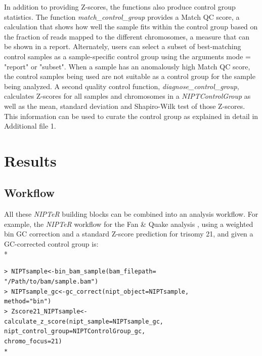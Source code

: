 In addition to providing Z-scores, the functions also produce control group statistics. 
The function \textsl{match\_control\_group} provides a Match QC score, a calculation that shows how well the sample fits within the control group based on the fraction of reads mapped to the different chromosomes, a measure that can be shown in a report. 
Alternately, users can select a subset of best-matching control samples as a sample-specific control group using the arguments mode = "report" or "subset". 
When a sample has an anomalously high Match QC score, the control samples being used are not suitable as a control group for the sample being analyzed. 
A second quality control function, \textsl{diagnose\_control\_group}, calculates Z-scores for all samples and chromosomes in a \textsl{NIPTControlGroup} as well as the mean, standard deviation and Shapiro-Wilk test of those Z-scores. 
This information can be used to curate the control group as explained in detail in Additional file 1.

\section{Results}\label{Results}
\subsection{Workflow}
All these \textsl{NIPTeR} building blocks can be combined into an analysis workflow. For example, the \textsl{NIPTeR} workflow for the Fan \& Quake analysis \cite{Fan_2010}, using a weighted bin GC correction and a standard Z-score prediction for trisomy 21, and given a GC-corrected control group is: \\* \vspace{-\baselineskip} %


\begin{alltt}
	\footnotesize  
		\noindent\textgreater\ NIPTsample \textless- bin\_bam\_sample(bam\_filepath = \\\indent "/Path/to/bam/sample.bam") \\
		\textgreater\ NIPTsample\_gc \textless- gc\_correct(nipt\_object =  NIPTsample,\\\indent method = "bin") \\
		\textgreater\ Zscore21\_NIPTsample \textless- \\\indent  calculate\_z\_score(nipt\_sample = NIPTsample\_gc,\\\indent nipt\_control\_group = NIPTControlGroup\_gc, \\\indent chromo\_focus = 21) \\*
\end{alltt}

